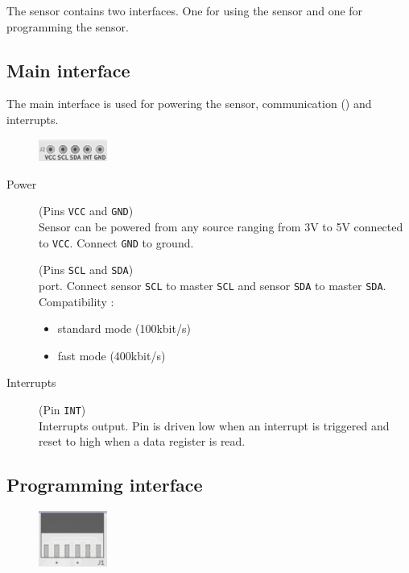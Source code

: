 The sensor contains two interfaces. One for using the sensor and one for programming the sensor.
\begin{multicols}{2}
\subsection{Main interface}
The main interface is used for powering the sensor, communication (\iic) and interrupts.
\begin{figure}[H]
 \centering
 \includegraphics[width=0.2\textwidth]{../img/J2.png}
\end{figure}

\begin{description}
	\item[Power] (Pins \texttt{VCC} and \texttt{GND}) \\
	Sensor can be powered from any source ranging from 3V to 5V connected to \texttt{VCC}. Connect \texttt{GND} to ground. 
	
	\item[\iic] (Pins \texttt{SCL} and \texttt{SDA}) \\
	\iic port. Connect sensor \texttt{SCL} to master \texttt{SCL} and sensor \texttt{SDA} to master \texttt{SDA}.\\
	Compatibility : \cite{i2cspec} \cite{microchipDS}
	\begin{itemize}
		\item standard mode (100kbit/s)
		\item fast mode (400kbit/s)
	\end{itemize}
	
	\item[Interrupts] (Pin \texttt{INT}) \\
	Interrupts output. Pin is driven low when an interrupt is triggered and reset to high when a data register is read.
\end{description}


\columnbreak

\subsection{Programming interface}
\begin{figure}[H]
 \centering
 \includegraphics[width=0.2\textwidth]{../img/J1.png}
\end{figure}


\end{multicols}
